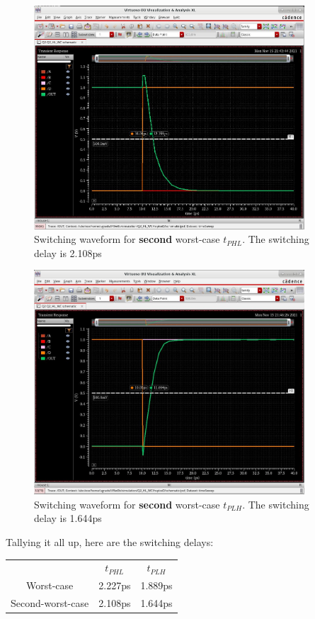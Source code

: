 \documentclass[11pt]{article}
\begin{document}
\begin{figure}[H]
\centering
  \includegraphics[width=0.9\textwidth]{swctphl.png}
  \caption{Switching waveform for \textbf{second} worst-case $t_{PHL}$. The switching delay is 2.108ps}
\end{figure}

\begin{figure}[H]
\centering
  \includegraphics[width=0.9\textwidth]{swctplh.png}
  \caption{Switching waveform for \textbf{second} worst-case $t_{PLH}$. The switching delay is 1.644ps }
\end{figure}

Tallying it all up, here are the switching delays:
\begin{center}
\begin{tabular}{ c c c }
   & $t_{PHL}$ & $t_{PLH}$ \\ 
 Worst-case & 2.227ps & 1.889ps \\  
 Second-worst-case & 2.108ps & 1.644ps    
\end{tabular}
\end{center}
\end{document}

